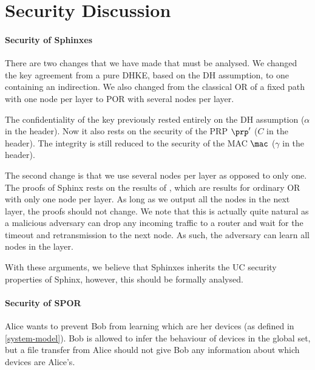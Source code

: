 \section{Security Discussion}%
\label{security-discussion}

\paragraph*{Security of Sphinxes}

There are two changes that we have made that must be analysed.
We changed the key agreement from a pure \ac{DHKE}, \ie based on the \ac{DH} 
assumption, to one containing an indirection.
We also changed from the classical \ac{OR} of a fixed path with one node per 
layer to \ac{POR} with several nodes per layer.

The confidentiality of the key previously rested entirely on the \ac{DH} 
assumption (\(\alpha\) in the header).
Now it also rests on the security of the \ac{PRP} \(\prp'\) (\(C\) in the 
header).
The integrity is still reduced to the security of the \ac{MAC} \(\mac\) 
(\(\gamma\) in the header).

The second change is that we use several nodes per layer as opposed to only 
one.
The proofs of Sphinx rests on the results of \textcite{CLOnionRouting}, which 
are results for ordinary \ac{OR} with only one node per layer.
As long as we output all the nodes in the next layer, the proofs should not 
change.
We note that this is actually quite natural as a malicious adversary can drop 
any incoming traffic to a router and wait for the timeout and retransmission to 
the next node.
As such, the adversary can learn all nodes in the layer.

With these arguments, we believe that Sphinxes inherits the \ac{UC} security 
properties of Sphinx, however, this should be formally analysed.

\paragraph*{Security of \acs*{SPOR}}

Alice wants to prevent Bob from learning which are her devices (as defined in 
\cref{system-model}).
Bob is allowed to infer the behaviour of devices in the global set,
but a file transfer from Alice should not give Bob any information about which 
devices are Alice's.

